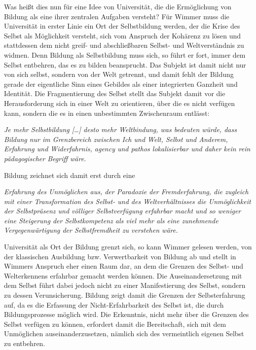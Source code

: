 Was heißt dies nun für eine Idee von Universität,
die die Ermöglichung von Bildung als eine ihrer zentralen Aufgaben versteht?
Für Wimmer muss die Universität in erster Linie ein Ort der Selbstbildung
werden, der die Krise des Selbst als Möglichkeit versteht, sich vom Anspruch
der Kohärenz zu lösen und stattdessen dem nicht greif- und abschließbaren
Selbst- und Weltverständnis zu widmen.  Denn Bildung als Selbstbildung muss
sich, so führt er fort, immer dem Selbst entbehren, das es zu bilden
beansprucht. Das Subjekt ist damit nicht nur von sich selbst, sondern von der
Welt getrennt, und damit fehlt der Bildung \glqq gerade der eigentliche Sinn eines
Gebildes als einer integrierten Ganzheit und Identität.\grqq \footnotemark {}  Die Fragmentierung
des Selbst stellt das Subjekt damit vor die Herausforderung sich in einer Welt
zu orientieren, über die es nicht verfügen kann, sondern die es in einen
unbestimmten Zwischenraum entlässt: 
\begin{myenv}
  \textit{ \glqq Je mehr Selbstbildung […] desto mehr
Weltbindung, was bedeuten würde, dass Bildung nur im Grenzbereich zwischen Ich
und Welt, Selbst und Anderem, Erfahrung und Widerfahrnis, agency und pathos
lokalisierbar und daher kein rein pädagogischer Begriff wäre.\grqq}
\footnotemark {}  
\end{myenv}

Bildung
zeichnet sich damit erst durch eine 
\begin{myenv}
  \textit{\glqq [...]Erfahrung des Unmöglichen aus, der
Paradoxie der Fremderfahrung, die zugleich mit einer Transformation des Selbst-
und des Weltverhältnisses die Unmöglichkeit der Selbstpräsenz und völliger
Selbstverfügung erfahrbar macht und so weniger eine Steigerung der
Selbstkompetenz als viel mehr als eine zunehmende Vergegenwärtigung der
Selbstfremdheit zu verstehen wäre.\grqq}
\footnotemark {}  
\end{myenv}

Universität als Ort der Bildung grenzt sich, so kann Wimmer gelesen werden, von
der klassischen Ausbildung bzw. Verwertbarkeit von Bildung ab und stellt in
Wimmers Anspruch eher einen Raum dar, an dem die Grenzen des Selbst- und
Welterkennens erfahrbar gemacht werden können. Die Auseinandersetzung mit dem
Selbst führt dabei jedoch nicht zu einer Manifestierung des Selbst, sondern zu
dessen Verunsicherung. Bildung zeigt damit die Grenzen der Selbsterfahrung auf,
da es die Erfassung der Nicht-Erfahrbarkeit des Selbst ist, die durch
Bildungsprozesse möglich wird. Die Erkenntnis, nicht mehr über die Grenzen des
Selbst verfügen zu können, erfordert damit die Bereitschaft, sich mit dem
Unmöglichen auseinanderzusetzen, nämlich sich des vermeintlich eigenen Selbst
zu entbehren.  

